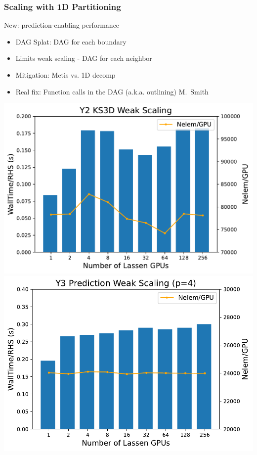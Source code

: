 \begin{frame}\frametitle{Scaling with 1D Partitioning}
\begin{minipage}[t][0.4\textheight][t]{\textwidth}
\begin{center}
New: prediction-enabling performance
\end{center}
\begin{multicols}{2}
\begin{itemize}
\item DAG Splat: DAG for each boundary
\item Limits weak scaling - DAG for each neighbor
\columnbreak
\item Mitigation: Metis vs. 1D decomp
\item Real fix: Function calls in the DAG (a.k.a. outlining)  \prj\tiny{M.~Smith}%
\end{itemize}
\end{multicols}
\end{minipage}\vfill
\vspace{-20pt}
\begin{minipage}[t][0.4\textheight][t]{\textwidth}
\centering
\includegraphics[width=.48\textwidth]{Figures/mtc/y2-prediction_weak_scaling.pdf}
\includegraphics[width=.48\textwidth]{Figures/mtc/y3-prediction_weak_scaling.pdf}
\end{minipage}
\end{frame}

